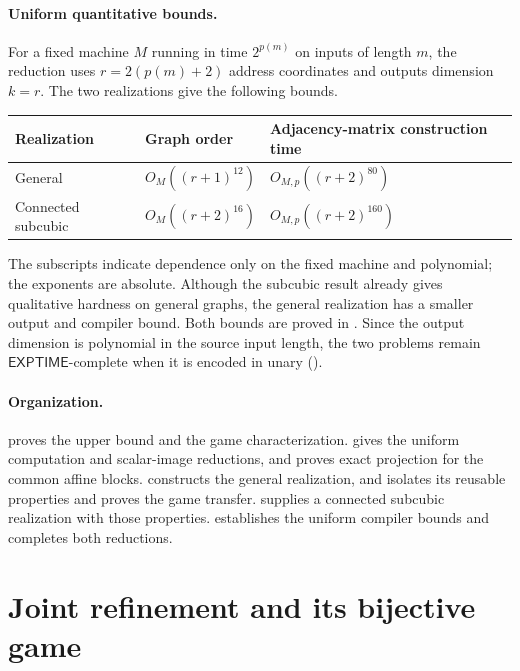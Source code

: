 \documentclass[11pt]{article}
\theoremstyle{definition}
\newcommand{\EXPTIME}{\mathsf{EXPTIME}}
\begin{document}
\paragraph{Uniform quantitative bounds.}
For a fixed machine \(M\) running in time \(2^{p(m)}\) on inputs of
length \(m\), the reduction uses
\(r=2(p(m)+2)\) address coordinates and outputs dimension \(k=r\).
The two realizations give the following bounds.
\begin{center}
\begin{tabular}{@{}lll@{}}
\toprule
Realization & Graph order & Adjacency-matrix construction time\\
\midrule
General & \(O_M((r+1)^{12})\) & \(O_{M,p}((r+2)^{80})\)\\
Connected subcubic & \(O_M((r+2)^{16})\) & \(O_{M,p}((r+2)^{160})\)\\
\bottomrule
\end{tabular}
\end{center}
The subscripts indicate dependence only on the fixed machine and
polynomial; the exponents are absolute. Although the subcubic result
already gives qualitative hardness on general graphs, the general
realization has a smaller output and compiler bound. Both bounds are
proved in .
Since the output dimension is polynomial in the source input length,
the two problems remain \(\EXPTIME\)-complete when it is encoded in
unary ().

\paragraph{Organization.}
 proves the upper bound and the game characterization.
 gives the uniform computation and scalar-image
reductions, and  proves exact projection for the
common affine blocks.  constructs the general
realization, and  isolates its reusable properties
and proves the game transfer.  supplies a connected
subcubic realization with those properties. 
establishes the uniform compiler bounds and completes both reductions.

\section{Joint refinement and its bijective game}
\label{game:section}
\end{document}
